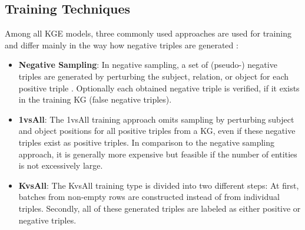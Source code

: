 \subsection{Training Techniques}
\label{subsec:training_techniques}
%
Among all \ac{KGE} models, three commonly used approaches are used for training and differ mainly in the way how negative triples are generated \cite{Ruffinelli2020You}:
\begin{itemize}
    \item  
    \textbf{Negative Sampling}:
    In negative sampling, a set of (pseudo-) negative triples are generated by perturbing the subject, relation, or object for each positive triple .
    Optionally each obtained negative triple is verified, if it exists in the training \ac{KG} (false negative triples).
    
    \item  
    \textbf{1vsAll}:
    The 1vsAll training approach omits sampling by perturbing subject and object positions for all positive triples from a \ac{KG}, even if these negative triples exist as positive triples.
    In comparison to the negative sampling approach, it is generally more expensive but feasible if the number of entities is not excessively large.
        
    \item  
    \textbf{KvsAll}: 
    The KvsAll training type is divided into two different steps:
    At first, batches from non-empty rows are constructed instead of from individual triples.
    Secondly, all of these generated triples are labeled as either positive or negative triples.
\end{itemize}